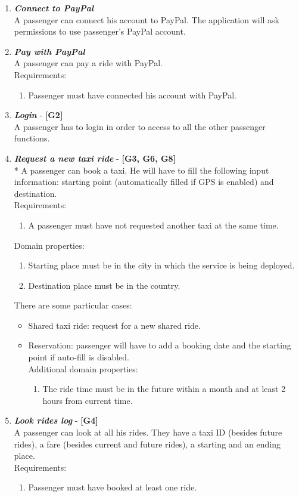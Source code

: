 \documentclass{article}
\begin{document}
\begin{enumerate}
\item \textit{\textbf{Connect to PayPal}}\\
A passenger can connect his account to PayPal. The application will ask permissions to use passenger's PayPal account.
\item \textit{\textbf{Pay with PayPal}}\\
A passenger can pay a ride with PayPal.\\
Requirements:
\begin{enumerate}
\item Passenger must have connected his account with PayPal.
\end{enumerate}

\item \textit{\textbf{Login}} - \textbf{[G2]}\\
A passenger has to login in order to access to all the other passenger functions.

\item \textit{\textbf{Request a new taxi ride}} - \textbf{[G3, G6, G8]}\\*
A passenger can book a taxi. He will have to fill the following input information: starting point (automatically filled if GPS is enabled) and destination.\\
Requirements:
\begin{enumerate}
\item A passenger must have not requested another taxi at the same time.
\end{enumerate}
Domain properties:
\begin{enumerate}
\item Starting place must be in the city in which the service is being deployed.
\item Destination place must be in the country.
\end{enumerate}
There are some particular cases:
\begin{itemize}
\item Shared taxi ride: request for a new shared ride.
\item Reservation: passenger will have to add a booking date and the starting point if auto-fill is disabled.\\
Additional domain properties:
\begin{enumerate}
\item The ride time must be in the future within a month and at least 2 hours from current time.
\end{enumerate}
\end{itemize}

\item \textit{\textbf{Look rides log}} - \textbf{[G4]}\\
A passenger can look at all his rides. They have a taxi ID (besides future rides), a fare (besides current and future rides), a starting and an ending place.\\
Requirements:
\begin{enumerate}
\item Passenger must have booked at least one ride.
\end{enumerate}
\end{enumerate}
\end{document}
